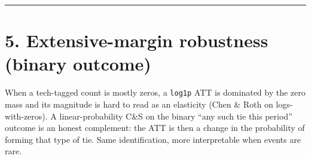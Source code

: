 \documentclass[
]{article}
\begin{document}
\begin{center}\rule{0.5\linewidth}{0.5pt}\end{center}

\section{5. Extensive-margin robustness (binary
outcome)}\label{extensive-margin-robustness-binary-outcome}

When a tech-tagged count is mostly zeros, a \texttt{log1p} ATT is
dominated by the zero mass and its magnitude is hard to read as an
elasticity (Chen \& Roth on logs-with-zeros). A linear-probability C\&S
on the binary ``any such tie this period'' outcome is an honest
complement: the ATT is then a change in the probability of forming that
type of tie. Same identification, more interpretable when events are
rare.
\end{document}
